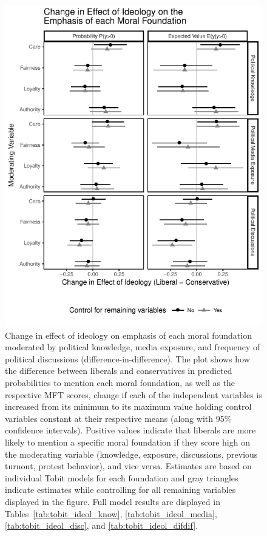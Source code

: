 \documentclass[12pt]{article}
\begin{document}
\begin{figure}[ht]\centering
\includegraphics[scale=.8]{../calc/fig/tobit_ideol_difdif.pdf}
\caption{Change in effect of ideology on emphasis of each moral foundation moderated by political knowledge, media exposure, and frequency of political discussions (difference-in-difference). The plot shows how the difference between liberals and conservatives in predicted probabilities to mention each moral foundation, as well as the respective MFT scores, change if each of the independent variables is increased from its minimum to its maximum value holding control variables constant at their respective means (along with 95\% confidence intervals). Positive values indicate that liberals are more likely to mention a specific moral foundation if they score high on the moderating variable (knowledge, exposure, discussions, previous turnout, protest behavior), and vice versa. Estimates are based on individual Tobit models for each foundation and gray triangles indicate estimates while controlling for all remaining variables displayed in the figure. Full model results are displayed in Tables~\ref{tab:tobit_ideol_know}, \ref{tab:tobit_ideol_media}, \ref{tab:tobit_ideol_disc}, and \ref{tab:tobit_ideol_difdif}.
}\label{fig:tobit_ideol_difdif}
\end{figure}
\end{document}
